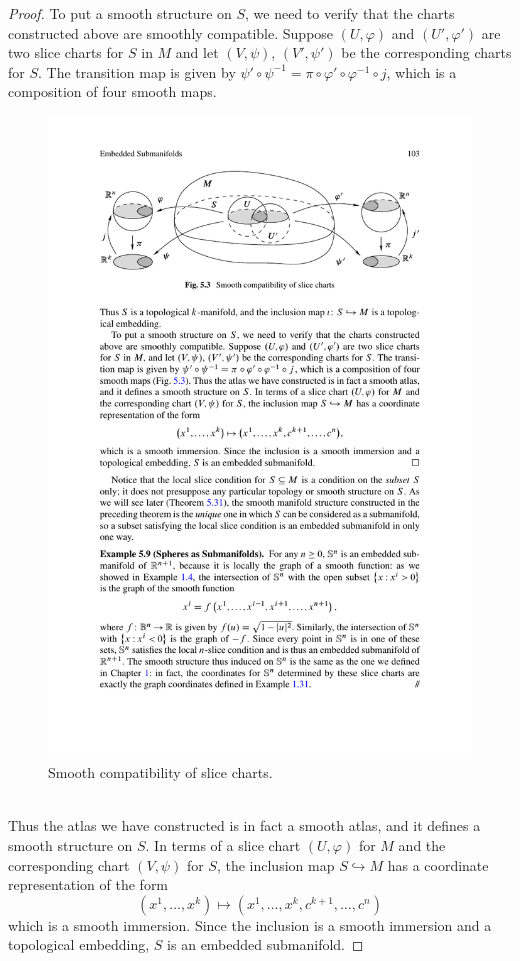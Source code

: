 \begin{proof}
To put a smooth structure on $S$, we need to verify that the charts constructed
above are smoothly compatible. Suppose $(U,\varphi)$ and $(U',\varphi')$ are two slice charts for $S$ in $M$ and let $(V,\psi)$, $(V',\psi')$ be the corresponding charts for $S$. The transition map is given by $\psi'\circ\psi^{-1}=\pi\circ\varphi'\circ\varphi^{-1}\circ j$, which is a composition of four smooth maps.
\begin{figure}[h]
\centering
\includegraphics{pictures/slice-chart-2}
\caption{Smooth compatibility of slice charts.}
\end{figure}\\
Thus the atlas we have constructed is in fact a smooth atlas, and it defines a smooth structure on $S$. In terms of a slice chart $(U,\varphi)$ for $M$ and the corresponding chart $(V,\psi)$ for $S$, the inclusion map $S\hookrightarrow M$ has a coordinate representation of the form
\[(x^1,\dots,x^k)\mapsto(x^1,\dots,x^k,c^{k+1},\dots,c^n)\]
which is a smooth immersion. Since the inclusion is a smooth immersion and a topological embedding, $S$ is an embedded submanifold.
\end{proof}
